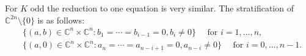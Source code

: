 \documentclass[10pt]{amsart}
\theoremstyle{remark}
\begin{document}
For $K$ odd the reduction to one equation is very similar. The stratification of $\mathbb{C}^{2n} \setminus \{0\}$ is as follows:
\begin{align*}
    &\lbrace (a,b) \in \mathbb{C}^n\times \mathbb{C}^n: b_1 = \cdots = b_{i-1} =  0, b_{i} \neq 0  \rbrace \quad \text{ for } i = 1, \dots, n, \\
    &\lbrace (a,0) \in \mathbb{C}^n\times \mathbb{C}^n: a_n = \cdots = a_{n-i+1} =  0, a_{n-i} \neq 0  \rbrace \quad \text{ for } i = 0, \dots, n-1.
\end{align*}

\end{document}
